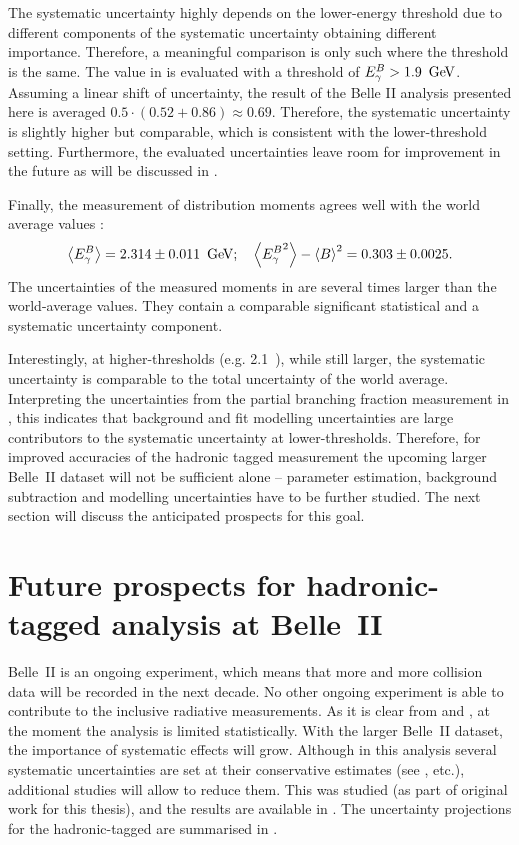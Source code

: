 The systematic uncertainty highly depends on the lower-\EB energy threshold due to different components of the systematic uncertainty obtaining different importance.
Therefore, a meaningful comparison is only such where the \EB threshold is the same.
The value in  is evaluated with a threshold of ${E^B_{\gamma}}>1.9~\mathrm{\,Ge\kern -0.1em V}$.
Assuming a linear shift of uncertainty, the result of the Belle II analysis presented here is averaged $0.5\cdot(0.52+0.86)\approx0.69$.
Therefore, the systematic uncertainty is slightly higher but comparable, which is consistent with the lower-\EB threshold setting.
Furthermore, the evaluated uncertainties leave room for improvement in the future as will be discussed in .

Finally, the measurement of \EB distribution moments agrees well with the world average values \cite{Workman:2022ynf}:
\begin{equation}
    \expval{\EB} = 2.314 \pm 0.011 ~\gev; \quad \expval{\EB^2} - \expval{\B}^2 = 0.303 \pm 0.0025.
\end{equation}
The uncertainties of the measured moments in  are several times larger than the world-average values.
They contain a comparable significant statistical and a systematic uncertainty component.

Interestingly, at higher-\EB thresholds (e.g. 2.1~\gev), while still larger, the systematic uncertainty is comparable to the total uncertainty of the world average.
Interpreting the uncertainties from the partial branching fraction measurement in , this indicates that background and fit modelling uncertainties are large contributors to the systematic uncertainty at lower-\EB thresholds.
Therefore, for improved accuracies of the hadronic tagged measurement
the upcoming larger Belle~II dataset will not be sufficient alone --
parameter estimation, background subtraction and modelling uncertainties have to be further studied.
The next section will discuss the anticipated prospects for this goal.

\section{Future prospects for hadronic-tagged \safeBtoXsgamma analysis at Belle~II}\label{sec:future_prospects}

Belle~II is an ongoing experiment, which means that more and more \epem collision data will be recorded in the next decade.
No other ongoing experiment is able to contribute to the inclusive radiative measurements.
As it is clear from  and , at the moment the analysis is limited statistically.
With the larger Belle~II dataset, the importance of systematic effects will grow.
Although in this analysis several systematic uncertainties are set at their conservative estimates (see ,  etc.),
additional studies will allow to reduce them.
This was studied (as part of original work for this thesis), and the results are available in \cite{Belle-II:2022cgf}.
The uncertainty projections for the hadronic-tagged \BtoXsgamma are summarised in .

